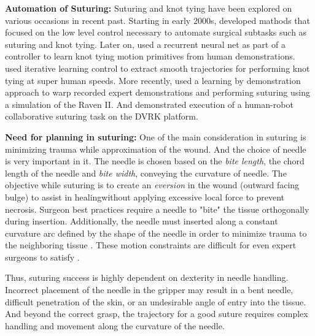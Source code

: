 \vspace{3pt}
\noindent\textbf{Automation of Suturing: }
Suturing and knot tying have been explored on various occasions in recent past. Starting in early 2000s, \citet{Kang2000Autonomous} developed mathods that focused on the low level control necessary
to automate surgical subtasks such as suturing and knot tying.
Later on, \citet{Mayer2006System} used a recurrent neural net as part of a controller to learn knot tying motion primitives from human demonstrations.\citet{Berg2010Superhuman} used iterative learning control to extract smooth trajectories for performing knot tying at super human speeds. More recently, \citet{Schulman2013Case} used a learning by demonstration approach to warp recorded
expert demonstrations and performing suturing using a simulation of the Raven II. And \citet{Padoy2011} demonstrated execution of a human-robot collaborative suturing task on the DVRK platform. 

\vspace{3pt}
\noindent \textbf{Need for planning in suturing: }
One of the main consideration in suturing is minimizing trauma while approximation of the wound. And the choice of needle is very important in it. The needle is chosen based on the \textit{bite length}, the chord length of the needle and \textit{bite width}, conveying the curvature of needle. The objective while suturing is to create an \textit{eversion} in the wound (outward facing bulge) to assist in healing\tocite without applying excessive local force to prevent necrosis. Surgeon best practices require a needle to "bite" the tissue orthogonally during insertion. Additionally, the needle must inserted along a constant curvature arc defined by the shape of the needle in order to minimize trauma to the neighboring tissue \cite{Jackson2013Needle}. These motion constraints are difficult for even expert surgeons to satisfy \cite{Kang2000Autonomous}.

Thus, suturing success is highly dependent on dexterity in needle handling. Incorrect placement of the needle in the gripper may result in a bent needle, difficult penetration of the skin, or an undesirable angle of entry into the tissue. And beyond the correct grasp, the trajectory for a good suture requires complex handling and movement along the curvature of the needle.

